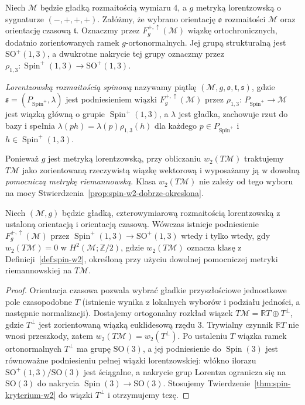 \begin{definicja}
\label{def:lorentzowska-rozmaitosc-spinowa}
Niech $\mathcal M$ będzie gładką rozmaitością wymiaru $4$,
a $g$ metryką lorentzowską o sygnaturze $(-,+,+,+)$.
Załóżmy, że wybrano orientację $\mathfrak o$ rozmaitości
$\mathcal M$ oraz orientację czasową $\mathfrak t$.
Oznaczmy przez $F^{+,\uparrow}_g(\mathcal M)$ wiązkę
ortochronicznych, dodatnio zorientowanych ramek
$g$-ortonormalnych. Jej grupą strukturalną jest
$\mathrm{SO}^+(1,3)$, a dwukrotne nakrycie tej grupy
oznaczmy przez
$\rho_{1,3}:\operatorname{Spin}^+(1,3)\to\mathrm{SO}^+(1,3)$.

\emph{Lorentzowską rozmaitością spinową} nazywamy
piątkę $(\mathcal M,g,\mathfrak o,\mathfrak t,\mathfrak s)$,
gdzie $\mathfrak s=(P_{\operatorname{Spin}^+},\lambda)$
jest podniesieniem wiązki $F^{+,\uparrow}_g(\mathcal M)$
przez $\rho_{1,3}$: $P_{\operatorname{Spin}^+}\to\mathcal M$
jest wiązką główną o grupie $\operatorname{Spin}^+(1,3)$,
a $\lambda$ jest gładka, zachowuje rzut do bazy
i spełnia $\lambda(ph)=\lambda(p)\rho_{1,3}(h)$
dla każdego $p\in P_{\operatorname{Spin}^+}$
i $h\in\operatorname{Spin}^+(1,3)$.
\end{definicja}

Ponieważ $g$ jest metryką lorentzowską, przy obliczaniu
$w_2(T\mathcal M)$ traktujemy $T\mathcal M$ jako zorientowaną
rzeczywistą wiązkę wektorową i wyposażamy ją w dowolną
\emph{pomocniczą metrykę riemannowską}. Klasa $w_2(T\mathcal M)$
nie zależy od tego wyboru na mocy
Stwierdzenia~\ref{prop:spin-w2-dobrze-okreslona}.

\begin{stwierdzenie}
\label{prop:spin-lorentz-kryterium}
Niech $(\mathcal M,g)$ będzie gładką,
czterowymiarową rozmaitością lorentzowską
z ustaloną orientacją i orientacją czasową.
Wówczas istnieje podniesienie
$F^{+,\uparrow}_g(\mathcal M)$ przez
$\operatorname{Spin}^+(1,3)\to\mathrm{SO}^+(1,3)$
wtedy i tylko wtedy, gdy
$w_2(T\mathcal M)=0$ w $H^2(\mathcal M;\mathbb Z/2)$,
gdzie $w_2(T\mathcal M)$ oznacza klasę z
Definicji~\ref{def:spin-w2}, określoną przy użyciu
dowolnej pomocniczej metryki riemannowskiej na $T\mathcal M$.
\end{stwierdzenie}
\begin{proof}
Orientacja czasowa pozwala wybrać gładkie
przyszłościowe jednostkowe pole czasopodobne $T$
(istnienie wynika z lokalnych wyborów i podziału
jedności, a następnie normalizacji). Dostajemy
ortogonalny rozkład wiązek
$T\mathcal M=\mathbb RT\oplus T^\perp$,
gdzie $T^\perp$ jest zorientowaną wiązką euklidesową
rzędu $3$. Trywialny czynnik $\mathbb RT$ nie wnosi
przeszkody, zatem $w_2(T\mathcal M)=w_2(T^\perp)$.
Po ustaleniu $T$ wiązka ramek ortonormalnych
$T^\perp$ ma grupę $\mathrm{SO}(3)$, a jej
podniesienie do $\operatorname{Spin}(3)$ jest
równoważne podniesieniu pełnej wiązki lorentzowskiej:
włókno ilorazu $\mathrm{SO}^+(1,3)/\mathrm{SO}(3)$
jest ściągalne, a nakrycie grup Lorentza ogranicza się
na $\mathrm{SO}(3)$ do nakrycia
$\operatorname{Spin}(3)\to\mathrm{SO}(3)$.
Stosujemy Twierdzenie~\ref{thm:spin-kryterium-w2}
do wiązki $T^\perp$ i otrzymujemy tezę.
\end{proof}

